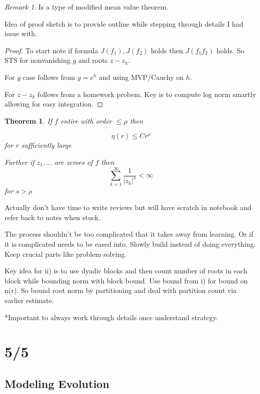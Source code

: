 \documentclass[11pt]{article}
\newtheorem{theorem}{Theorem}
\theoremstyle{remark}
\newtheorem{remark}{Remark}
\begin{document}
\begin{remark}
	Is a type of modified mean value theorem.
\end{remark}

Idea of proof sketch is to provide outline while stepping through details I had issue with.

\begin{proof}
	To start note if formula $J(f_1),J(f_2)$ holds then $J(f_1f_2)$ holds. So STS for nonvanishing $g$ and roots $z-z_k$. 

	For $g$ case follows from $g = e^h$ and using MVP/Cauchy on $h$. 

	For $z-z_k$ follows from a homework probem. Key is to compute log norm smartly allowing for easy integration.
\end{proof}

\begin{theorem}
	If $f$ entire with order $\leq \rho$ then

	\begin{equation*}
		\eta(r) \leq Cr^{\rho}
	\end{equation*} for $r$ sufficiently large

	Further if $z_1,...$ are zeroes of $f$ then
	\begin{equation*}
		\sum_{k=1}^{\infty}\frac{1}{|z_k|^s} < \infty
	\end{equation*} for $s > \rho$
\end{theorem}

Actually don't have time to write reviews but will have scratch in notebook and refer back to notes when stuck.

The process shouldn't be too complicated that it takes away from learning. Or if it is complicated needs to be eased into. Slowly build instead of doing everything. Keep crucial parts like problem solving.

Key idea for ii) is to use dyadic blocks and then count number of roots in each block while bounding norm with block bound. Use bound from i) for bound on n(r). So bound root norm by partitioning and deal with partition count via earlier estimate.

*Important to always work through details once understand strategy.

\section{5/5}

\subsection{Modeling Evolution}
\end{document}
